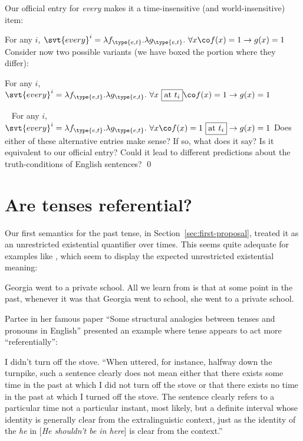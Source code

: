 \begin{exercise}
  Our official entry for \emph{every} makes it a time-insensitive (and
  world-insensitive) item:

  \ex For any $i$,
  $\svt{every}^{i} = \lambda f_{\type{e,t}}.\lambda g_{\type{e,t}}.\ \forall x\co
  f(x)=1 \rightarrow g(x)=1$ \xe
%
  Consider now two possible variants (we have boxed the portion where they
  differ):

  \ex For any $i$,
  $\svt{every}^{i} = \lambda f_{\type{e,t}}.\lambda g_{\type{e,t}}.\ \forall x
  \ \boxed{\text{at}\ t_{i}}\co
  f(x)=1 \rightarrow g(x)=1$ \xe

  \ex~ For any $i$,
  $\svt{every}^{i} = \lambda f_{\type{e,t}}.\lambda g_{\type{e,t}}.\ \forall x\co
  f(x)=1\ \boxed{\text{at}\ t_{i}} \rightarrow g(x)=1$ \xe
  Does either of these alternative entries make sense? If so, what does it say?
  Is it equivalent to our official entry? Could it lead to different predictions
  about the truth-conditions of English sentences? \qed
\end{exercise}

\section{Are tenses referential?}
\label{sec:referential}

Our first semantics for the past tense, in Section~\ref{sec:first-proposal},
treated it as an unrestricted existential quantifier over times. This seems
quite adequate for examples like \Next, which seem to display the expected
unrestricted existential meaning:

\ex Georgia went to a private school.\label{ex:school}\xe
%
All we learn from \Last is that at some point in the past, whenever it was that
Georgia went to school, she went to a private school.

Partee in her famous paper ``Some structural analogies between tenses and
pronouns in English'' \parencite{partee-1973-analogies} presented an example
where tense appears to act more ``referentially'':

\ex I didn’t turn off the stove.\label{ex:stove} \xe
%
``When uttered, for instance, halfway down the turnpike, such a sentence clearly
does not mean either that there exists some time in the past at which I did not
turn off the stove or that there exists no time in the past at which I turned
off the stove. The sentence clearly refers to a particular time \dash not a
particular instant, most likely, but a definite interval whose identity is
generally clear from the extralinguistic context, just as the identity of the
\emph{he} in [\emph{He shouldn’t be in here}] is clear from the context.''

